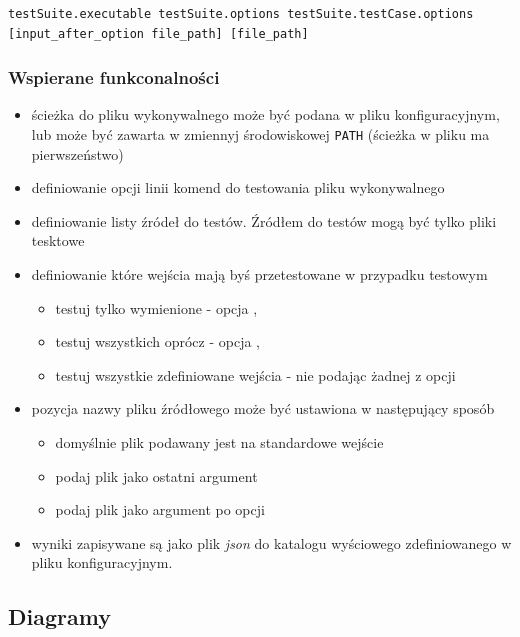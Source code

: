 \documentclass[a4paper,12pt]{article}
\begin{document}
\begin{verbatim}
testSuite.executable testSuite.options testSuite.testCase.options [input_after_option file_path] [file_path]
\end{verbatim}

\subsubsection{Wspierane funkconalności}
\begin{itemize}
  \item ścieżka do pliku wykonywalnego może być podana w pliku konfiguracyjnym, lub może być zawarta w zmiennyj środowiskowej \texttt{PATH} (ścieżka w pliku ma pierwszeństwo)
  \item definiowanie opcji linii komend do testowania pliku wykonywalnego
  \item definiowanie listy źródeł do testów. Źródłem do testów mogą być tylko pliki tesktowe
  \item definiowanie które wejścia mają byś przetestowane w przypadku testowym
    \begin{itemize}
      \item testuj tylko wymienione - opcja ,
      \item testuj wszystkich oprócz - opcja ,
      \item testuj wszystkie zdefiniowane wejścia - nie podając żadnej z opcji
    \end{itemize}
  \item pozycja nazwy pliku źródłowego może być ustawiona w następujący sposób
    \begin{itemize}
      \item domyślnie plik podawany jest na standardowe wejście
      \item podaj plik jako ostatni argument 
      \item podaj plik jako argument po opcji 
    \end{itemize}
  \item wyniki zapisywane są jako plik \textit{json} do katalogu wyściowego zdefiniowanego w pliku konfiguracyjnym.
\end{itemize}

\subsection{Diagramy}
\end{document}
